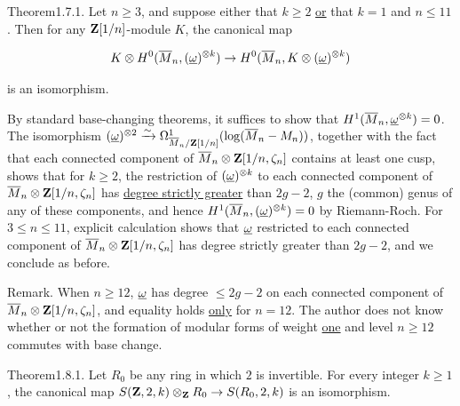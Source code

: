 
\begin{kathm}{Theorem}{1.7.1.}
Let $n\geq 3$, and suppose either that $k\geq 2$ \uline{or} that $k=1$ and
$n\leq 11$. Then for any $\mathbf{Z}[1/n]$-module $K$, the canonical map

\[
K\otimes H^0(\overline{M}_n,(\underline{\omega})^{\otimes k})\to H^0(\overline{M}_n,K\otimes(\underline{\omega})^{\otimes k})
\]

is an isomorphism.
\end{kathm}

\begin{kaproof}
By standard base-changing theorems, it suffices to show that
$H^1(\overline{M}_n,\underline{\omega}^{\otimes k}) = 0$. The isomorphism
$(\underline{\omega})^{\otimes 2}\xrightarrow{\sim}\Omega^1_{\overline{M}_n/\mathbf{Z}[1/n]}(\log(\overline{M}_n-M_n))$,
together with the fact that each connected component of
$\overline{M}_n\otimes\mathbf{Z}[1/n,\zeta_n]$ contains at least one cusp, shows that for
$k\geq 2$, the restriction of $(\underline{\omega})^{\otimes k}$ to each connected component of
$\overline{M}_n\otimes\mathbf{Z}[1/n,\zeta_n]$ has \uline{degree strictly greater} than $2g-2$,
$g$ the (common) genus of any of these components, and hence
$H^1(\overline{M}_n,(\underline{\omega})^{\otimes k})=0$ by Riemann-Roch. For $3\leq n\leq 11$,
explicit calculation shows that $\underline{\omega}$ restricted to each connected component of
$\overline{M}_n\otimes\mathbf{Z}[1/n,\zeta_n]$ has degree strictly greater than $2g-2$, and we
conclude as before.
\end{kaproof}

\begin{kathmstar}{Remark.}
When $n\geq 12$, $\underline{\omega}$ has degree $\leq 2g-2$ on each connected component of
$\overline{M}_n\otimes\mathbf{Z}[1/n,\zeta_n]$, and equality holds \uline{only} for $n=12$. The
author does not know whether or not the formation of modular forms of weight
\uline{one} and level $n\geq 12$ commutes with base change.
\end{kathmstar}


\begin{kathm}{Theorem}{1.8.1.}
Let $R_0$ be any ring in which $2$ is invertible. For every integer $k\geq 1$,
the canonical map $S(\mathbf{Z},2,k)\otimes_{\mathbf{Z}} R_0\to S(R_0,2,k)$ is an isomorphism.
\end{kathm}

